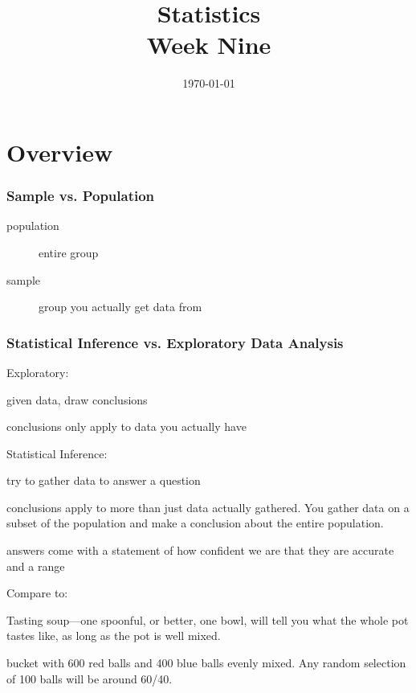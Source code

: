 \documentclass[landscape]{exam}
\title{Statistics \\ Week Nine}
\date{\today}
\author{}
\begin{document}
  \maketitle
  \tableofcontents

  \part{Overview}


  \section{Sample vs. Population}

  \begin{description}
    \item[population] entire group
    \item[sample] group you actually get data from
  \end{description}

  \section{Statistical Inference vs. Exploratory Data Analysis}
  
  Exploratory:
  \begin{itemize*}
    \item given data, draw conclusions
    \item conclusions only apply to data you actually have
  \end{itemize*}

  Statistical Inference:
  \begin{itemize*}
    \item try to gather data to answer a question

    \item conclusions apply to more than just data actually gathered. You gather
      data on a subset of the population and make a conclusion about the entire
      population.

    \item answers come with a statement of how confident we are that they are
      accurate and a range
  \end{itemize*}

  Compare to:
  \begin{itemize*}
    \item Tasting soup---one spoonful, or better, one bowl, will tell you what
      the whole pot tastes like, as long as the pot is well mixed.

    \item bucket with 600 red balls and 400 blue balls evenly mixed. Any random
      selection of 100 balls will be around 60/40.

  \end{itemize*}
\end{document}
